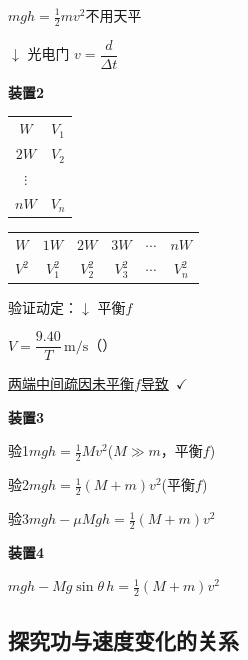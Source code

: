 $mgh=\frac{1}{2}mv^2$\quad 不用天平

$\downarrow$ 光电门 $v=\dfrac{d}{\Delta t}$


\textbf{装置2}


\begin{tabular}{@{}c@{\qquad}c@{}}
$W$ & $V_1$ \\
$2W$ & $V_2$ \\
$\vdots$ & \\
$nW$ & $V_n$
\end{tabular}

\begin{center}
\begin{tabular}{|c|c|c|c|c|c|}
\hline
$W$ & $1W$ & $2W$ & $3W$ & $\cdots$ & $nW$ \\
$V^2$ & $V_1^2$ & $V_2^2$ & $V_3^2$ & $\cdots$ & $V_n^2$ \\
\hline
\end{tabular}
\end{center}

验证动定：$\downarrow$ 平衡$f$




$V=\dfrac{9.40}{T}\,\mathrm{m/s}$（）\quad {}\quad {}\quad {}

\underline{两端中间疏因未平衡$f$导致}\ $\checkmark$

\textbf{装置3}


验1\quad $mgh=\frac{1}{2}Mv^2$\quad ($M\gg m$，平衡$f$)

验2\quad $mgh=\frac{1}{2}(M+m)v^2$\quad (平衡$f$)

验3\quad $mgh-\mu Mgh=\frac{1}{2}(M+m)v^2$

\textbf{装置4}


$mgh-Mg\sin\theta\,h=\frac{1}{2}(M+m)v^2$

\subsection{探究功与速度变化的关系}

